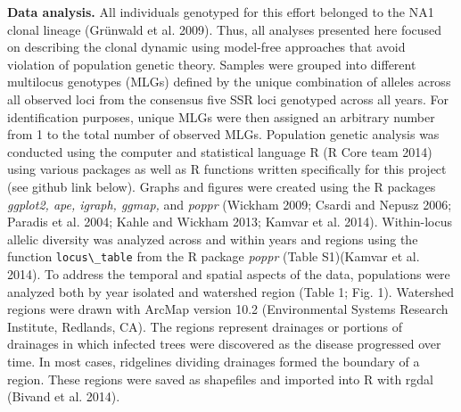 \documentclass[double,12pt]{beavtex}
\begin{document}
  \textbf{Data analysis.} All individuals genotyped for this effort
  belonged to the NA1 clonal lineage (Grünwald et al. 2009). Thus, all
  analyses presented here focused on describing the clonal dynamic using
  model-free approaches that avoid violation of population genetic theory.
  Samples were grouped into different multilocus genotypes (MLGs) defined
  by the unique combination of alleles across all observed loci from the
  consensus five SSR loci genotyped across all years. For identification
  purposes, unique MLGs were then assigned an arbitrary number from 1 to
  the total number of observed MLGs. Population genetic analysis was
  conducted using the computer and statistical language R (R Core team
  2014) using various packages as well as R functions written specifically
  for this project (see github link below). Graphs and figures were
  created using the R packages \emph{ggplot2, ape, igraph, ggmap,} and
  \emph{poppr} (Wickham 2009; Csardi and Nepusz 2006; Paradis et al. 2004;
  Kahle and Wickham 2013; Kamvar et al. 2014). Within-locus allelic
  diversity was analyzed across and within years and regions using the
  function \texttt{locus\textbackslash{}\_table} from the R package
  \emph{poppr} (Table S1)(Kamvar et al. 2014). To address the temporal and
  spatial aspects of the data, populations were analyzed both by year
  isolated and watershed region (Table 1; Fig. 1). Watershed regions were
  drawn with ArcMap version 10.2 (Environmental Systems Research
  Institute, Redlands, CA). The regions represent drainages or portions of
  drainages in which infected trees were discovered as the disease
  progressed over time. In most cases, ridgelines dividing drainages
  formed the boundary of a region. These regions were saved as shapefiles
  and imported into R with rgdal (Bivand et al. 2014).
  
\end{document}
